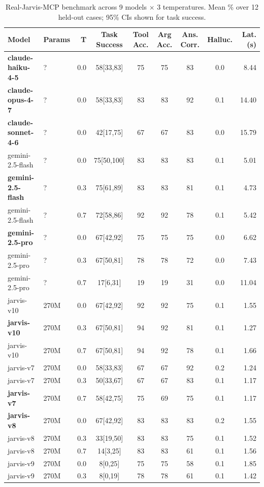 \begin{table}[t]
\centering
\small
\caption{Real-Jarvis-MCP benchmark across 9 models $\times$ 3 temperatures. Mean \% over 12 held-out cases; 95\% CIs shown for task success.}
\label{tab:mcp_bench}
\begin{tabular}{llrcccccr}
\toprule
Model & Params & T & Task Success & Tool Acc. & Arg Acc. & Ans. Corr. & Halluc. & Lat.(s) \\
\midrule
\textbf{claude-haiku-4-5} & ? & 0.0 & 58[33,83] & 75 & 75 & 83 & 0.0 & 8.44 \\
\textbf{claude-opus-4-7} & ? & 0.0 & 58[33,83] & 83 & 83 & 92 & 0.1 & 14.40 \\
\textbf{claude-sonnet-4-6} & ? & 0.0 & 42[17,75] & 67 & 67 & 83 & 0.0 & 15.79 \\
gemini-2.5-flash & ? & 0.0 & 75[50,100] & 83 & 83 & 83 & 0.1 & 5.01 \\
\textbf{gemini-2.5-flash} & ? & 0.3 & 75[61,89] & 83 & 83 & 81 & 0.1 & 4.73 \\
gemini-2.5-flash & ? & 0.7 & 72[58,86] & 92 & 92 & 78 & 0.1 & 5.42 \\
\textbf{gemini-2.5-pro} & ? & 0.0 & 67[42,92] & 75 & 75 & 75 & 0.0 & 6.62 \\
gemini-2.5-pro & ? & 0.3 & 67[50,81] & 78 & 78 & 72 & 0.0 & 7.43 \\
gemini-2.5-pro & ? & 0.7 & 17[6,31] & 19 & 19 & 31 & 0.0 & 11.04 \\
jarvis-v10 & 270M & 0.0 & 67[42,92] & 92 & 92 & 75 & 0.1 & 1.55 \\
\textbf{jarvis-v10} & 270M & 0.3 & 67[50,81] & 94 & 92 & 81 & 0.1 & 1.27 \\
jarvis-v10 & 270M & 0.7 & 67[50,81] & 94 & 92 & 78 & 0.1 & 1.66 \\
jarvis-v7 & 270M & 0.0 & 58[33,83] & 67 & 67 & 92 & 0.2 & 1.24 \\
jarvis-v7 & 270M & 0.3 & 50[33,67] & 67 & 67 & 83 & 0.1 & 1.17 \\
\textbf{jarvis-v7} & 270M & 0.7 & 58[42,75] & 75 & 69 & 75 & 0.1 & 1.17 \\
\textbf{jarvis-v8} & 270M & 0.0 & 67[42,92] & 83 & 83 & 83 & 0.2 & 1.55 \\
jarvis-v8 & 270M & 0.3 & 33[19,50] & 83 & 83 & 75 & 0.1 & 1.52 \\
jarvis-v8 & 270M & 0.7 & 14[3,25] & 83 & 83 & 61 & 0.1 & 1.56 \\
jarvis-v9 & 270M & 0.0 & 8[0,25] & 75 & 75 & 58 & 0.1 & 1.85 \\
jarvis-v9 & 270M & 0.3 & 8[0,19] & 78 & 78 & 61 & 0.1 & 1.42 \\

\end{tabular}
\end{table}
